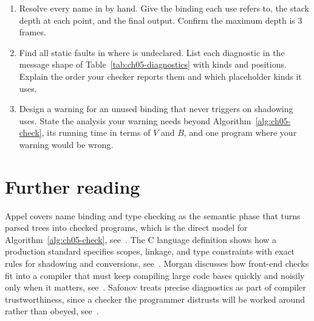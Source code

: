 \begin{enumerate}
\item \label{ex:ch05-resolve-shadow} Resolve every name in  by hand. Give the binding each use refers to, the stack depth at each point, and the final output. Confirm the maximum depth is $3$ frames.
\item \label{ex:ch05-find-mismatch} Find all static faults in  where  is undeclared. List each diagnostic in the message shape of Table~\ref{tab:ch05-diagnostics} with kinds and positions. Explain the order your checker reports them and which placeholder kinds it uses.
\item \label{ex:ch05-warn-design} Design a warning for an unused  binding that never triggers on shadowing uses. State the analysis your warning needs beyond Algorithm~\ref{alg:ch05-check}, its running time in terms of $V$ and $B$, and one program where your warning would be wrong.
\end{enumerate}

\section{Further reading}
\label{sec:ch05-further-reading}

Appel covers name binding and type checking as the semantic phase that turns parsed trees into checked programs, which is the direct model for Algorithm~\ref{alg:ch05-check}, see~\cite{appel-1998-modern}.
The C language definition shows how a production standard specifies scopes, linkage, and type constraints with exact rules for shadowing and conversions, see~\cite{wg14-2011-c11}.
Morgan discusses how front-end checks fit into a compiler that must keep compiling large code bases quickly and noisily only when it matters, see~\cite{morgan-1998-optimizing}.
Safonov treats precise diagnostics as part of compiler trustworthiness, since a checker the programmer distrusts will be worked around rather than obeyed, see~\cite{safonov-2010-trustworthy}.
